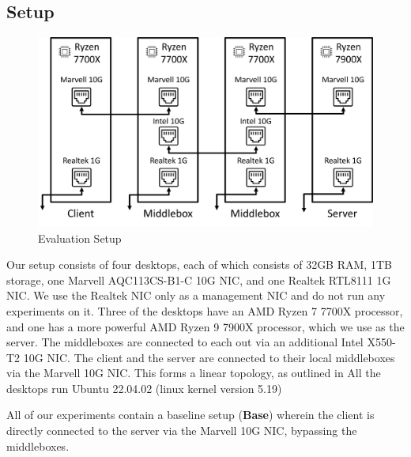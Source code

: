 \subsection{Setup}
\label{subsec:netshaper-evaluation-setup}

\begin{figure}[!htb]
    \centering
    \includegraphics[width=\columnwidth]{figures/netshaper/testbed-setup.png}
    \caption{Evaluation Setup}
    \label{fig:testbed-setup}
\end{figure}

Our setup consists of four desktops, each of which consists of 32GB RAM, 1TB storage, one Marvell AQC113CS-B1-C 10G NIC, and one Realtek RTL8111 1G NIC.
We use the Realtek NIC only as a management NIC and do not run any experiments on it.
Three of the desktops have an AMD Ryzen 7 7700X processor, and one has a more powerful AMD Ryzen 9 7900X processor, which we use as the server.
The middleboxes are connected to each out via an additional Intel X550-T2 10G NIC.
The client and the server are connected to their local middleboxes via the Marvell 10G NIC.
This forms a linear topology, as outlined in 
All the desktops run Ubuntu 22.04.02 (linux kernel version 5.19)

All of our experiments contain a baseline setup (\textbf{Base}) wherein the client is directly connected to the server via the Marvell 10G NIC, bypassing the middleboxes.

